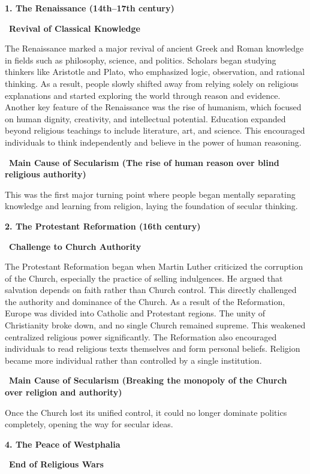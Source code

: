 \documentclass[12pt]{article}
\begin{document}
\textbf{1. The Renaissance (14th–17th century)}

\textbullet\ \textbf{Revival of Classical Knowledge}

The Renaissance marked a major revival of ancient Greek and Roman knowledge in fields such as philosophy, science, and politics. Scholars began studying thinkers like Aristotle and Plato, who emphasized logic, observation, and rational thinking. As a result, people slowly shifted away from relying solely on religious explanations and started exploring the world through reason and evidence. Another key feature of the Renaissance was the rise of humanism, which focused on human dignity, creativity, and intellectual potential. Education expanded beyond religious teachings to include literature, art, and science. This encouraged individuals to think independently and believe in the power of human reasoning.

\textbullet\ \textbf{Main Cause of Secularism (The rise of human reason over blind religious authority)}

This was the first major turning point where people began mentally separating knowledge and learning from religion, laying the foundation of secular thinking.

\textbf{2. The Protestant Reformation (16th century)}

\textbullet\ \textbf{Challenge to Church Authority}

The Protestant Reformation began when Martin Luther criticized the corruption of the Church, especially the practice of selling indulgences. He argued that salvation depends on faith rather than Church control. This directly challenged the authority and dominance of the Church. As a result of the Reformation, Europe was divided into Catholic and Protestant regions. The unity of Christianity broke down, and no single Church remained supreme. This weakened centralized religious power significantly. The Reformation also encouraged individuals to read religious texts themselves and form personal beliefs. Religion became more individual rather than controlled by a single institution.

\textbullet\ \textbf{Main Cause of Secularism (Breaking the monopoly of the Church over religion and authority)}

Once the Church lost its unified control, it could no longer dominate politics completely, opening the way for secular ideas.

\textbf{4. The Peace of Westphalia}

\textbullet\ \textbf{End of Religious Wars}
\end{document}
